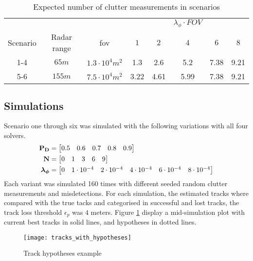 \begin{table}
\centering
\begin{tabular}{c c c c c c c c}
			&				&						& & &$\lambda_\phi \cdot FOV$& 	&		\\
Scenario 	& Radar range	& \gls{fov}				& $1$ 	& $2$ 	& $4$ 	&$6$ 	& $8$	\\ \hline
1-4		 	& $65 m$ 		& $1.3\cdot10^4 m^2$	& 1.3 	& 2.6 	& 5.2 	& 7.38 	& 9.21 	\\
5-6		 	& $155 m$		& $7.5\cdot10^4 m^2$	& 3.22 	& 4.61 	& 5.99 	& 7.38 	& 9.21 					
\end{tabular}
\caption{Expected number of clutter measurements in scenarios}
\label{tab:clutter_measurements}
\end{table}

\subsection{Simulations}
Scenario one through six was simulated with the following variations with all four solvers.
\begin{equation*}
\begin{split}
\boldsymbol{\mathbf{P_D}} &= \begin{bmatrix} 0.5 & 0.6 & 0.7 & 0.8 & 0.9 \end{bmatrix} \\
\boldsymbol{\mathbf{N}} &=\begin{bmatrix} 0 & 1 & 3 & 6 & 9 \end{bmatrix} \\
\boldsymbol{\mathbf{\lambda_\phi}} &=\begin{bmatrix} 0 & 1\cdot10^{-4} & 2\cdot10^{-4} & 4\cdot10^{-4} & 6\cdot10^{-4} & 8\cdot10^{-4} \end{bmatrix}
\end{split}
\end{equation*}
Each variant was simulated 160 times with different seeded random clutter measurements and misdetections. For each simulation, the estimated tracks where compared with the true tacks and categorised in successful and lost tracks, the track loss threshold $\epsilon_p$ was $4$ meters. Figure \ref{fig:track_hypotheses_example} display a mid-simulation plot with current best tracks in solid lines, and hypotheses in dotted lines. 
\begin{figure}[H]
    \centering
    \texttt{[image: tracks\_with\_hypotheses]}
    \caption{Track hypotheses example}
    \label{fig:track_hypotheses_example}
\end{figure}
